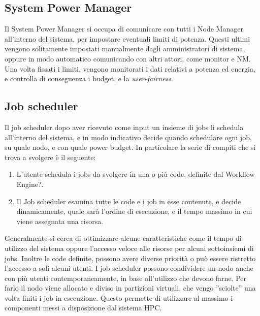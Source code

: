 \subsection{System Power Manager}
Il System Power Manager si occupa di comunicare con tutti i Node Manager all'interno del sistema, per impostare eventuali limiti di potenza. Questi ultimi vengono solitamente impostati manualmente dagli amministratori di sistema, oppure in modo automatico comunicando con altri attori, come monitor e NM. Una volta fissati i limiti, vengono monitorati i dati relativi a potenza ed energia, e controlla di conseguenza i budget, e la \emph{user-fairness}.
\subsection{Job scheduler}
Il job scheduler dopo aver ricevuto come input un insieme di jobs li schedula all'interno del sistema, e in modo indicativo decide quando schedulare ogni job, su quale nodo, e con quale power budget. In particolare la serie di compiti che si trova a svolgere è il seguente:
\begin{enumerate}
    \item L'utente schedula i jobs da svolgere in una o più code, definite dal Workflow Engine?. %
    \item Il Job scheduler esamina tutte le code e i job in esse contenute, e decide dinamicamente, quale sarà l'ordine di esecuzione, e il tempo massimo in cui viene assegnata una risorsa.
\end{enumerate}
Generalmente si cerca di ottimizzare alcune caratteristiche come il tempo di utilizzo del sistema oppure l'accesso veloce alle risorse per alcuni sottoinsiemi di jobs. Inoltre le code definite, possono avere diverse priorità o può essere ristretto l'accesso a soli alcuni utenti. I job scheduler possono condividere un nodo anche con più utenti contemporaneamente, in base all'utilizzo che devono farne. Per farlo il nodo viene allocato e diviso in partizioni virtuali, che vengo ''sciolte'' una volta finiti i job in esecuzione. Questo permette di utilizzare al massimo i componenti messi a disposizione dal sistema HPC.

